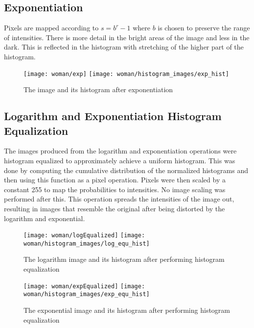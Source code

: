 \documentclass[12pt,letterpaper]{article}
\begin{document}
\subsection{Exponentiation}
Pixels are mapped according to $s = b^r - 1$ where $b$ is chosen to preserve the range of intensities. There is more detail in the bright areas of the image and less in the dark. This is reflected in the histogram with stretching of the higher part of the histogram.
\begin{figure}[ht]
\centering
\texttt{[image: woman/exp]} \hspace{0.5cm} \texttt{[image: woman/histogram\_images/exp\_hist]}
\caption{\small{The image and its histogram after exponentiation}
\label{fig:exp} }
\end{figure}

\vspace{-0.5cm}

\subsection{Logarithm and Exponentiation Histogram Equalization}
The images produced from the logarithm and exponentiation operations were histogram equalized to approximately achieve a uniform histogram. This was done by computing the cumulative distribution of the normalized histograms and then using this function as a pixel operation. Pixels were then scaled by a constant 255 to map the probabilities to intensities. No image scaling was performed after this. This operation spreads the intensities of the image out, resulting in images that resemble the original after being distorted by the logarithm and exponential.

\begin{figure}[ht]
\centering
\texttt{[image: woman/logEqualized]} \hspace{0.5cm} \texttt{[image: woman/histogram\_images/log\_equ\_hist]}
\caption{\small{The logarithm image and its histogram after performing histogram equalization}
\label{fig:log_equ} }
\end{figure}

\begin{figure}[ht]
\centering
\texttt{[image: woman/expEqualized]} \hspace{0.5cm} \texttt{[image: woman/histogram\_images/exp\_equ\_hist]}
\caption{\small{The exponential image and its histogram after performing histogram equalization}
\label{fig:exp_equ} }
\end{figure}
\end{document}
